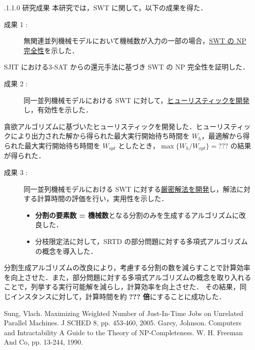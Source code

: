 \documentclass[oneside, 10pt, twocolumn]{jarticle}
\makeatletter
\def\section{\@startsection {section}{1}{\z@}{-3.5ex plus -1ex minus
-.2ex}{2.3 ex plus .2ex}{\large\bf}}
\renewcommand{\section}{
\@startsection{section}{1}{\z@}
{.1\Cvs \@plus.0\Cdp \@minus.1\Cdp}%
{.1\Cvs \@plus.1\Cdp \@minus.0\Cdp}%
{\reset@font\large\bfseries}}      %
\makeatother
\begin{document}
\section{研究成果}
本研究では，SWT に関して，以下の成果を得た．
\begin{description}
  \item[成果 1 : ]
  無関連並列機械モデルにおいて機械数が入力の一部の場合，\underline{SWT の NP 完全性}を示した．
\end{description}
SJIT における\textsc{3-SAT} からの還元手法に基づき SWT の NP 完全性を証明した．

\begin{description}
  \item[成果 2 : ]
  同一並列機械モデルにおける SWT に対して，\underline{ヒューリスティックを開発}し，有効性を示した．
\end{description}
貪欲アルゴリズムに基づいたヒューリスティックを開発した．ヒューリスティックにより出力された解から得られた最大実行開始待ち時間を $W_h$，最適解から得られた最大実行開始待ち時間を $W_{opt}$ としたとき，\mbox{\boldmath $\max\big\{W_h/W_{opt}\big\} = ???$} の結果が得られた．

\begin{description}
  \item[成果 3 : ]
  同一並列機械モデルにおける SWT に対する\underline{厳密解法を開発}し，解法に対する計算時間の評価を行い，実用性を示した．
  \begin{itemize}
    \setlength{\leftskip}{-10mm}
    \item {\bf 分割の要素数 = 機械数}となる分割のみを生成するアルゴリズムに改良した．
    \item 分枝限定法に対して，SRTD の部分問題に対する多項式アルゴリズムの概念を導入した．
  \end{itemize}
\end{description}
分割生成アルゴリズムの改良により，考慮する分割の数を減らすことで計算効率を向上させた．また，部分問題に対する多項式アルゴリズムの概念を取り入れることで，列挙する実行可能解を減らし，計算効率を向上させた．
その結果，同じインスタンスに対して，計算時間を約 {\bf ??? 倍}にすることに成功した．

\begin{thebibliography}{9} %
  Sung, Vlach.
  Maximizing Weighted Number of Just-In-Time Jobs on Unrelated Parallel Machines. J SCHED 8, pp. 453-460, 2005.
  \vspace{-2mm}
  Garey, Johnson.
  Computers and Intractability A Guide to the Theory of NP-Completeness.
  W. H. Freeman And Co, pp. 13-244, 1990.
\end{thebibliography}
\end{document}
